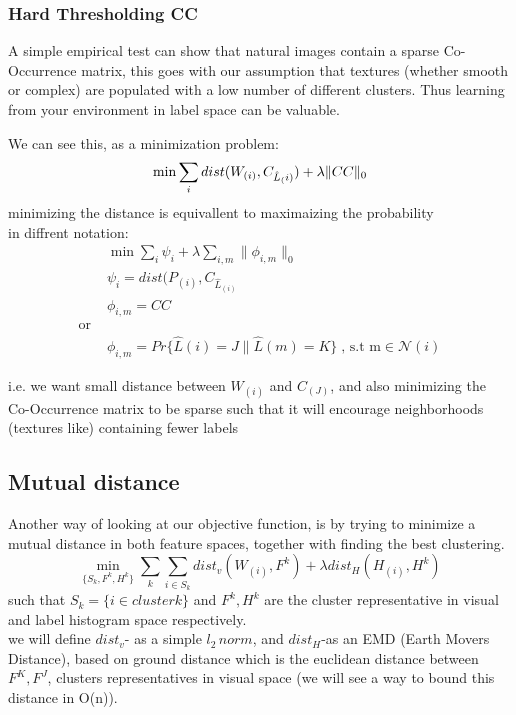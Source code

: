 \documentclass{article}
\begin{document}
\subsubsection{Hard Thresholding CC}
A simple empirical test can show that natural images contain a sparse Co-Occurrence  matrix, this goes with our assumption that textures (whether smooth or complex) are populated with a low number of different clusters. Thus learning from your environment in label space can be valuable.

We can see this, as a minimization problem:
\begin{equation}
\min\sum_i dist(W_{(i)},C_{\hat L_(i)})+\lambda\lVert CC\rVert_0 \label{eq:minimizer}\\
\end{equation}
minimizing the distance is equivallent to maximaizing the probability\\
in diffrent notation:
\begin{align}
&\min\sum_i \psi_i +\lambda\sum_{i,m}\lVert\phi_{i,m}\rVert_0 \\
&\psi_i=dist(P_{(i)},C_{\hat L_(i)} \nonumber\\
&\phi_{i,m}=CC\nonumber \\
\text{or  } \nonumber\\
&\phi_{i,m}=Pr\{\hat L(i)=J\|\hat L(m)=K\}\;\text{,  s.t m}\in \mathcal{N}(i)\nonumber
\end{align}

i.e. we want small distance between $W_{(i)}$ and $C_{(J)}$, and also minimizing the Co-Occurrence matrix to be sparse such that it will encourage neighborhoods (textures like) containing fewer labels

\subsection{Mutual distance}
Another way of looking at our objective function, is by trying to minimize a mutual distance in both feature spaces, together with finding the best clustering.
\begin{equation}
\min_{\{S_k , F^k,H^k\}} \sum_k \sum_{i\in S_k} dist_v(W_{(i)},F^k)+\lambda dist_H(H_{(i)},H^k)
\end{equation}
such that $ S_k=\{i\in cluster k\} $ and $ F^k,H^k $ are the cluster representative in visual and label histogram space respectively.\\
we will define $ dist_v $- as a simple $ l_2\,norm $, and $ dist_H $-as an EMD (Earth Movers Distance), based on ground distance which is the euclidean distance between $ F^K,F^J $, clusters representatives in visual space (we will see a way to bound this distance in O(n)).\\
\end{document}
